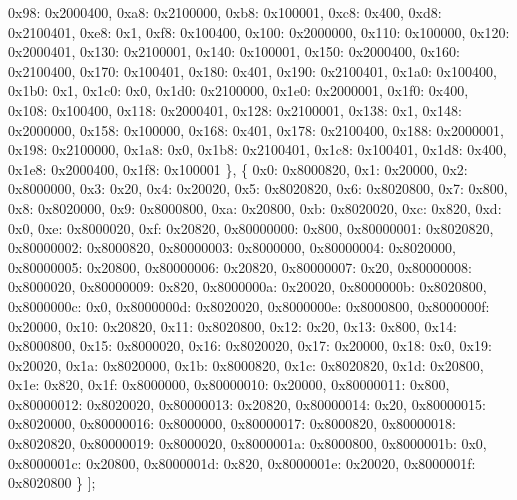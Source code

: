 \begin{DoxyCodeInclude}
            0x98: 0x2000400,
            0xa8: 0x2100000,
            0xb8: 0x100001,
            0xc8: 0x400,
            0xd8: 0x2100401,
            0xe8: 0x1,
            0xf8: 0x100400,
            0x100: 0x2000000,
            0x110: 0x100000,
            0x120: 0x2000401,
            0x130: 0x2100001,
            0x140: 0x100001,
            0x150: 0x2000400,
            0x160: 0x2100400,
            0x170: 0x100401,
            0x180: 0x401,
            0x190: 0x2100401,
            0x1a0: 0x100400,
            0x1b0: 0x1,
            0x1c0: 0x0,
            0x1d0: 0x2100000,
            0x1e0: 0x2000001,
            0x1f0: 0x400,
            0x108: 0x100400,
            0x118: 0x2000401,
            0x128: 0x2100001,
            0x138: 0x1,
            0x148: 0x2000000,
            0x158: 0x100000,
            0x168: 0x401,
            0x178: 0x2100400,
            0x188: 0x2000001,
            0x198: 0x2100000,
            0x1a8: 0x0,
            0x1b8: 0x2100401,
            0x1c8: 0x100401,
            0x1d8: 0x400,
            0x1e8: 0x2000400,
            0x1f8: 0x100001
        \},
        \{
            0x0: 0x8000820,
            0x1: 0x20000,
            0x2: 0x8000000,
            0x3: 0x20,
            0x4: 0x20020,
            0x5: 0x8020820,
            0x6: 0x8020800,
            0x7: 0x800,
            0x8: 0x8020000,
            0x9: 0x8000800,
            0xa: 0x20800,
            0xb: 0x8020020,
            0xc: 0x820,
            0xd: 0x0,
            0xe: 0x8000020,
            0xf: 0x20820,
            0x80000000: 0x800,
            0x80000001: 0x8020820,
            0x80000002: 0x8000820,
            0x80000003: 0x8000000,
            0x80000004: 0x8020000,
            0x80000005: 0x20800,
            0x80000006: 0x20820,
            0x80000007: 0x20,
            0x80000008: 0x8000020,
            0x80000009: 0x820,
            0x8000000a: 0x20020,
            0x8000000b: 0x8020800,
            0x8000000c: 0x0,
            0x8000000d: 0x8020020,
            0x8000000e: 0x8000800,
            0x8000000f: 0x20000,
            0x10: 0x20820,
            0x11: 0x8020800,
            0x12: 0x20,
            0x13: 0x800,
            0x14: 0x8000800,
            0x15: 0x8000020,
            0x16: 0x8020020,
            0x17: 0x20000,
            0x18: 0x0,
            0x19: 0x20020,
            0x1a: 0x8020000,
            0x1b: 0x8000820,
            0x1c: 0x8020820,
            0x1d: 0x20800,
            0x1e: 0x820,
            0x1f: 0x8000000,
            0x80000010: 0x20000,
            0x80000011: 0x800,
            0x80000012: 0x8020020,
            0x80000013: 0x20820,
            0x80000014: 0x20,
            0x80000015: 0x8020000,
            0x80000016: 0x8000000,
            0x80000017: 0x8000820,
            0x80000018: 0x8020820,
            0x80000019: 0x8000020,
            0x8000001a: 0x8000800,
            0x8000001b: 0x0,
            0x8000001c: 0x20800,
            0x8000001d: 0x820,
            0x8000001e: 0x20020,
            0x8000001f: 0x8020800
        \}
    ];


\end{DoxyCodeInclude}
